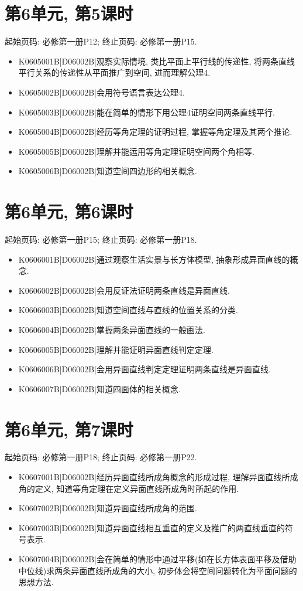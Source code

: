 \section*{第6单元, 第5课时}
起始页码: 必修第一册P12; 终止页码: 必修第一册P15.
\begin{itemize}
\item K0605001B|D06002B|观察实际情境, 类比平面上平行线的传递性, 将两条直线平行关系的传递性从平面推广到空间, 进而理解公理4.
\item K0605002B|D06002B|会用符号语言表达公理4.
\item K0605003B|D06002B|能在简单的情形下用公理4证明空间两条直线平行.
\item K0605004B|D06002B|经历等角定理的证明过程, 掌握等角定理及其两个推论.
\item K0605005B|D06002B|理解并能运用等角定理证明空间两个角相等.
\item K0605006B|D06002B|知道空间四边形的相关概念.
\end{itemize}

\section*{第6单元, 第6课时}
起始页码: 必修第一册P15; 终止页码: 必修第一册P18.
\begin{itemize}
\item K0606001B|D06002B|通过观察生活实景与长方体模型, 抽象形成异面直线的概念.
\item K0606002B|D06002B|会用反证法证明两条直线是异面直线.
\item K0606003B|D06002B|知道空间直线与直线的位置关系的分类.
\item K0606004B|D06002B|掌握两条异面直线的一般画法.
\item K0606005B|D06002B|理解并能证明异面直线判定定理.
\item K0606006B|D06002B|会用异面直线判定定理证明两条直线是异面直线.
\item K0606007B|D06002B|知道四面体的相关概念.
\end{itemize}

\section*{第6单元, 第7课时}
起始页码: 必修第一册P18; 终止页码: 必修第一册P22.
\begin{itemize}
\item K0607001B|D06002B|经历异面直线所成角概念的形成过程, 理解异面直线所成角的定义, 知道等角定理在定义异面直线所成角时所起的作用.
\item K0607002B|D06002B|知道异面直线所成角的范围.
\item K0607003B|D06002B|知道异面直线相互垂直的定义及推广的两直线垂直的符号表示.
\item K0607004B|D06002B|会在简单的情形中通过平移(如在长方体表面平移及借助中位线)求两条异面直线所成角的大小, 初步体会将空间问题转化为平面问题的思想方法.
\end{itemize}

